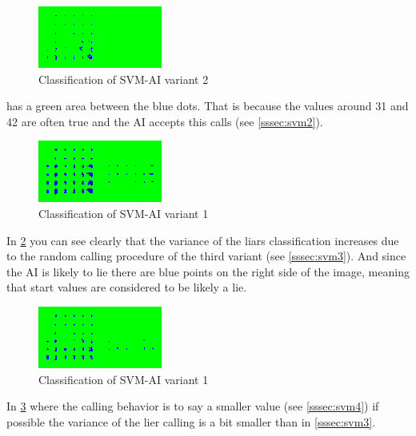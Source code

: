 \documentclass[11pt]{article}
\begin{document}
\begin{figure}[H]
	\centering
	\includegraphics[width=.45\textwidth]{../testdata/svm2.png}
	\caption{Classification of SVM-AI variant 2}
	\label{fig:svm2}
\end{figure}

 has a green area between the blue dots. That is because the values around 31 and 42 are often true and the AI accepts this calls (see \cref{sssec:svm2}).

\begin{figure}[H]
	\centering
	\includegraphics[width=.45\textwidth]{../testdata/svm3.png}
	\caption{Classification of SVM-AI variant 1}
	\label{fig:svm3}
\end{figure}
In \cref{fig:svm3} you can see clearly that the variance of the liars classification increases due to the random calling procedure of the third variant (see \cref{sssec:svm3}). And since the AI is likely to lie there are blue points on the right side of the image, meaning that start values are considered to be likely a lie. 

\begin{figure}[H]
	\centering
	\includegraphics[width=.45\textwidth]{../testdata/svm4.png}
	\caption{Classification of SVM-AI variant 1}
	\label{fig:svm4}
\end{figure}

In \cref{fig:svm4} where the calling behavior is to say a smaller value (see \cref{sssec:svm4}) if possible the variance of the lier calling is a bit smaller than in \cref{sssec:svm3}.
\end{document}
